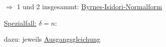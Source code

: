 \documentclass[openany,a4paper,11pt]{book}
\begin{document}
\begin{enumerate}
\begin{itemize}
        $\Rightarrow$ 1 und 2 insgesammt: \uline{Byrnes-Isidori-Normalform} \\
        \begin{minipage}[c]{\textwidth}
        \end{minipage}
        \uline{Spezialfall:} $\delta=n$:
        \begin{minipage}[c]{\textwidth}
        \end{minipage}
        dazu: jeweils \uline{Ausgangsgleichung}  
    \end{itemize}
\end{enumerate}
\end{document}
